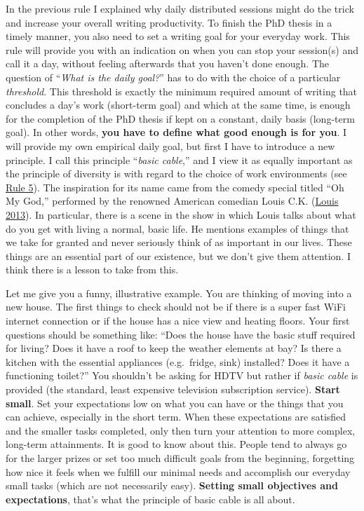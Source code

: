 \documentclass[
  12pt,
  oneside]{book}
\begin{document}
In the previous rule I explained why daily distributed sessions might do the trick and increase your overall writing productivity.
To finish the PhD thesis in a timely manner, you also need to set a writing goal for your everyday work.
This rule will provide you with an indication on when you can stop your session(s) and call it a day, without feeling afterwards that you haven't done enough.
The question of ``\emph{What is the daily goal?}'' has to do with the choice of a particular \emph{threshold}.
This threshold is exactly the minimum required amount of writing that concludes a day's work (short-term goal) and which at the same time, is enough for the completion of the PhD thesis if kept on a constant, daily basis (long-term goal).
In other words, \textbf{you have to define what good enough is for you}.
I will provide my own empirical daily goal, but first I have to introduce a new principle.
I call this principle ``\emph{basic cable},'' and I view it as equally important as the principle of diversity is with regard to the choice of work environments (see \protect\hyperlink{rule5}{Rule 5}).
The inspiration for its name came from the comedy special titled ``Oh My God,'' performed by the renowned American comedian Louis C.K. (\protect\hyperlink{ref-BasicCable-LCK}{Louis 2013}).
In particular, there is a scene in the show in which Louis talks about what do you get with living a normal, basic life.
He mentions examples of things that we take for granted and never seriously think of as important in our lives.
These things are an essential part of our existence, but we don't give them attention.
I think there is a lesson to take from this.

Let me give you a funny, illustrative example.
You are thinking of moving into a new house.
The first things to check should not be if there is a super fast WiFi internet connection or if the house has a nice view and heating floors.
Your first questions should be something like: ``Does the house have the basic stuff required for living?
Does it have a roof to keep the weather elements at bay?
Is there a kitchen with the essential appliances (e.g.~fridge, sink) installed?
Does it have a functioning toilet?''
You shouldn't be asking for HDTV but rather if \emph{basic cable} is provided (the standard, least expensive television subscription service).
\textbf{Start small}.
Set your expectations low on what you can have or the things that you can achieve, especially in the short term.
When these expectations are satisfied and the smaller tasks completed, only then turn your attention to more complex, long-term attainments.
It is good to know about this.
People tend to always go for the larger prizes or set too much difficult goals from the beginning, forgetting how nice it feels when we fulfill our minimal needs and accomplish our everyday small tasks (which are not necessarily easy).
\textbf{Setting small objectives and expectations}, that's what the principle of basic cable is all about.
\end{document}
